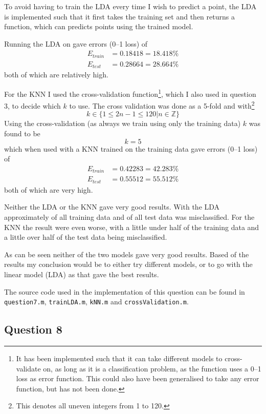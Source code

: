 \documentclass[a4paper, 11pt]{article}
\begin{document}
To avoid having to train the LDA every time I wish to predict a point, the LDA is implemented such that it first takes the training set and then returns a function, which can predicts points using the trained model.

Running the LDA on gave errors (0--1 loss) of
\begin{align*}
    E_{\mathit{train}} &= 0.18418 = 18.418 \% \\
    E_{\mathit{test}} &= 0.28664 = 28.664 \%
\end{align*}
both of which are relatively high.

For the KNN I used the cross-validation function\footnote{It has been implemented such that it can take different models to cross-validate on, as long as it is a classification problem, as the function uses a 0--1 loss as error function. This could also have been generalised to take any error function, but has not been done.}, which I also used in question 3, to decide which $k$ to use. The cross validation was done as a 5-fold and with\footnote{This denotes all uneven integers from 1 to 120.}
\[
k \in \lbrace 1 \le 2n-1 \le 120 | n \in \mathbb{Z} \rbrace
\]
Using the cross-validation (as always we train using only the training data) $k$ was found to be
\[
    k = 5
\]
which when used with a KNN trained on the training data gave errors (0--1 loss) of
\begin{align*}
    E_{\mathit{train}} &= 0.42283 = 42.283 \% \\
    E_{\mathit{test}} &= 0.55512 = 55.512 \%
\end{align*}
both of which are very high.

Neither the LDA or the KNN gave very good results. With the LDA approximately  of all training data and  of all test data was misclassified. For the KNN the result were even worse, with a little under half of the training data and a little over half of the test data being misclassified.

As can be seen neither of the two models gave very good results. Based of the results my conclusion would be to either try different models, or to go with the linear model (LDA) as that gave the best results.

The source code used in the implementation of this question can be found in \texttt{question7.m}, \texttt{trainLDA.m}, \texttt{kNN.m} and \texttt{crossValidation.m}.

\subsection*{Question 8} %
\end{document}
